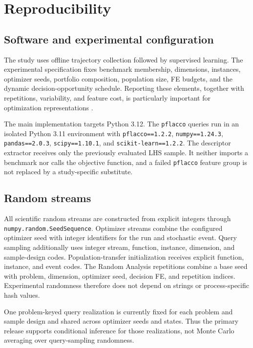 \section{Reproducibility}
\label{sec:reproducibility}

\subsection{Software and experimental configuration}

The study uses offline trajectory collection followed by supervised learning.
The experimental specification fixes benchmark membership, dimensions,
instances, optimizer seeds, portfolio composition, population size, FE budgets,
and the dynamic decision-opportunity schedule.
Reporting these elements, together with repetitions, variability, and feature
cost, is particularly important for optimization representations
\cite{cenikjSurveyFeaturesUsed2026}.

The main implementation targets Python 3.12.  The \texttt{pflacco} queries run
in an isolated Python 3.11 environment with \texttt{pflacco==1.2.2},
\texttt{numpy==1.24.3}, \texttt{pandas==2.0.3}, \texttt{scipy==1.10.1}, and
\texttt{scikit-learn==1.2.2}.  The descriptor extractor receives only the
previously evaluated LHS sample.  It neither imports a benchmark nor calls the
objective function, and a failed \texttt{pflacco} feature group is not replaced
by a study-specific substitute.

\subsection{Random streams}

All scientific random streams are constructed from explicit integers through
\texttt{numpy.random.SeedSequence}.  Optimizer streams combine the configured
optimizer seed with integer identifiers for the run and stochastic event.
Query sampling additionally uses integer stream, function, instance, dimension,
and sample-design codes.  Population-transfer initialization receives explicit
function, instance, and event codes.  The Random Analysis repetitions combine a
base seed with problem, dimension, optimizer seed, decision FE, and repetition
indices.  Experimental randomness therefore does not depend on strings or
process-specific hash values.

One problem-keyed query realization is currently fixed for each problem and
sample design and shared across optimizer seeds and states.  Thus the primary
release supports conditional inference for those realizations, not Monte Carlo
averaging over query-sampling randomness.


